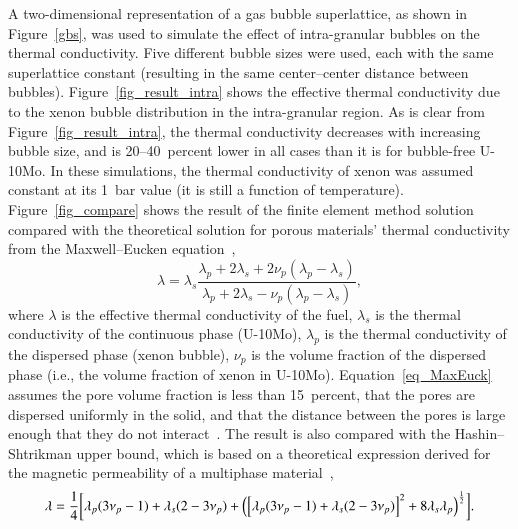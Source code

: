 A two-dimensional representation of a gas bubble superlattice, as shown in
Figure~\ref{gbs}, was used to simulate the effect of intra-granular bubbles on the thermal conductivity.
Five different bubble sizes were used, each with the same superlattice
constant (resulting in the same center--center distance between bubbles).
Figure~\ref{fig_result_intra} shows the effective thermal conductivity due to the xenon bubble distribution in the intra-granular region.
As is clear from Figure~\ref{fig_result_intra}, the thermal conductivity decreases with increasing bubble size, and is 20--40~percent lower in all cases than it is for bubble-free U-10Mo. In these simulations, the thermal conductivity of xenon was assumed constant at its 1~bar value (it is still a function of temperature).
Figure~\ref{fig_compare} shows the result of the finite element method solution compared with the theoretical solution for porous materials' thermal conductivity from the Maxwell--Eucken equation~\cite{maxwell1881treatise}, 
\begin{equation}
	\lambda = \lambda_s\frac{\lambda_p+2\lambda_s+2\nu_p(\lambda_p-\lambda_s)}{\lambda_p+2\lambda_s-\nu_p(\lambda_p-\lambda_s)},
	\label{eq_MaxEuck}
\end{equation}
where $\lambda$ is the effective thermal conductivity of the fuel, $\lambda_s$ is the thermal conductivity of the continuous phase (U-10Mo), $\lambda_p$ is the thermal conductivity of the dispersed phase (xenon bubble), $\nu_p$ is the volume fraction of the dispersed phase (i.e., the volume fraction of xenon in U-10Mo). Equation~\eqref{eq_MaxEuck} assumes the pore volume fraction is less than 15~percent, that the pores are dispersed uniformly in the solid, and that the distance between the pores is large enough that they do not interact~\cite{clark2003monolithic,smith2013thermal}. The result is also compared with the Hashin--Shtrikman upper bound, which is based on a theoretical expression derived for the magnetic permeability of a multiphase material~\cite{hashin1962variational},
\begin{equation}
\lambda = \frac{1}{4}\biggl[ \lambda_p(3\nu_p-1) + \lambda_s(2-3\nu_p) + \Bigl( \left[ \lambda_p (3\nu_p -1) + \lambda_s(2-3\nu_p) \right]^2 + 8\lambda_s\lambda_p \Bigr)^{\frac{1}{2}}
    \biggr].
\label{eq:Hash-Sht}
\end{equation}


